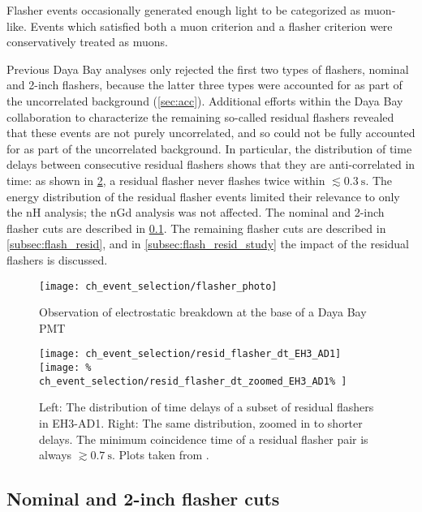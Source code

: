 Flasher events occasionally generated enough light to be categorized as muon-like.
Events which satisfied both a muon criterion and a flasher criterion
were conservatively treated as muons.

Previous Daya Bay analyses only rejected the first two types of flashers,
nominal and 2-inch flashers,
because the latter three types were accounted for
as part of the uncorrelated background (\cref{sec:acc}).
Additional efforts within the Daya Bay collaboration
to characterize the remaining so-called residual flashers
revealed that these events are not purely uncorrelated,
and so could not be fully accounted for as part of the uncorrelated background.
In particular, the distribution of time delays
between consecutive residual flashers
shows that they are anti-correlated in time:
as shown in \cref{fig:flasher_anticorr},
a residual flasher never flashes twice within $\lesssim \SI{0.3}{\s}$.
The energy distribution of the residual flasher events
limited their relevance to only the nH analysis; the nGd analysis was not affected.
The nominal and 2-inch flasher cuts are described in \cref{subsec:flash_nominal}.
The remaining flasher cuts are described in \cref{subsec:flash_resid},
and in \cref{subsec:flash_resid_study} the impact of the residual flashers
is discussed.

\begin{figure}
    \centering
    \texttt{[image: ch\_event\_selection/flasher\_photo]}
    \caption{
        Observation of electrostatic breakdown at the base of a Daya Bay PMT
        \cite{flasherphotos_docdb}
    }
    \label{fig:flasher_photo}
\end{figure}

\begin{figure}
    \texttt{[image: ch\_event\_selection/resid\_flasher\_dt\_EH3\_AD1]}
    \texttt{[image: \%
        ch\_event\_selection/resid\_flasher\_dt\_zoomed\_EH3\_AD1\%
    ]}
    \caption{
        Left: The distribution of time delays
        of a subset of residual flashers in EH3-AD1.
        Right: The same distribution, zoomed in to shorter delays.
        The minimum coincidence time of a residual flasher pair is always
        $\gtrsim \SI{0.7}{\s}$.
        Plots taken from \cite{beda_resid_flasher_dt}.
    }
    \label{fig:flasher_anticorr}
\end{figure}

\subsection{Nominal and 2-inch flasher cuts}
\label{subsec:flash_nominal}

